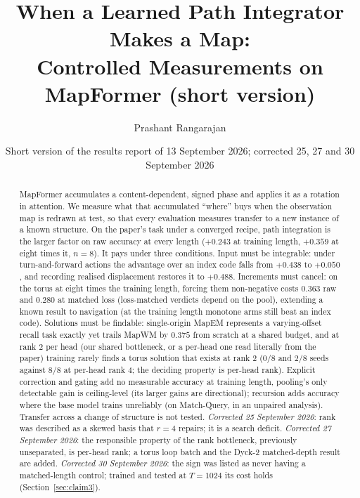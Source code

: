 \documentclass[10pt]{article}
\title{When a Learned Path Integrator Makes a Map:\\
\large Controlled Measurements on MapFormer (short version)}
\date{Short version of the results report of 13 September 2026; corrected 25, 27 and 30 September 2026}
\author{Prashant Rangarajan}
\begin{document}
\maketitle

\begin{abstract}
\noindent
MapFormer accumulates a content-dependent, signed phase and applies it as a rotation in attention. We measure
what that accumulated ``where'' buys when the observation map is redrawn at test, so that every evaluation
measures transfer to a new instance of a known structure. On the paper's task under a converged recipe, path
integration is the larger factor on raw accuracy at every length ($+0.243$ at training length, $+0.359$ at eight
times it, $n=8$). It pays under three conditions. Input must be integrable: under turn-and-forward actions the
advantage over an index code falls from $+0.438$ to $+0.050$, and recording realised displacement restores it to
$+0.488$. Increments must cancel: on the torus at eight times the training length, forcing them non-negative
costs $0.363$ raw and $0.280$ at matched loss (loss-matched verdicts depend on the pool), extending a known result
to navigation (at the training length monotone arms still beat an index code). Solutions must be findable:
single-origin MapEM represents a varying-offset recall task exactly yet trails MapWM by $0.375$ from scratch at a
shared budget, and at rank 2 per head (our shared bottleneck, or a per-head one read literally from the paper)
training rarely finds a torus solution that exists at rank 2 ($0/8$ and $2/8$ seeds against $8/8$ at per-head rank 4; the deciding property is per-head rank). Explicit correction and gating add no measurable accuracy
at training length, pooling's only detectable gain is ceiling-level (its larger gains are directional); recursion adds accuracy where the base model trains
unreliably (on Match-Query, in an unpaired analysis). Transfer across a change of structure is not tested.
\emph{Corrected 25 September 2026}: rank was described as a skewed basis that $r=4$ repairs; it is a search
deficit. \emph{Corrected 27 September 2026}: the responsible property of the rank bottleneck, previously
unseparated, is per-head rank; a torus loop batch and the Dyck-2 matched-depth result are added.
\emph{Corrected 30 September 2026}: the sign was listed as never having a matched-length control; trained and
tested at $T=1024$ its cost holds (Section~\ref{sec:claim3}).
\end{abstract}

\end{document}
